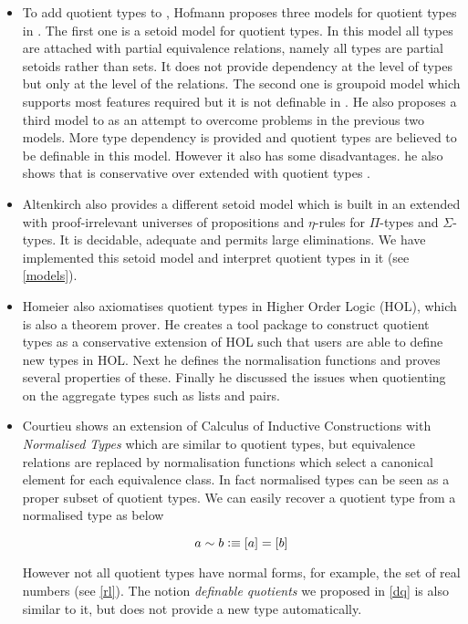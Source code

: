\begin{itemize}
\item To add quotient types to \mltt, Hofmann proposes three models for
quotient types in \cite{hof:phd}. The first one is a setoid model for
quotient types. In this model all types are attached with partial
equivalence relations, namely all types are partial setoids rather than
sets. It does not provide dependency at the level of types but only at the level of the relations. 
The second one is groupoid model which supports most features required 
but it is not definable in \itt. 
He also proposes a third model to as an attempt to overcome problems in the previous two models. More type dependency is provided and quotient types are believed to be definable in this model.
However it also has some disadvantages. 
he also shows that \ett is conservative over \itt extended with quotient types \cite{hof:95:con}.


\item Altenkirch \cite{alti:lics99} also provides a different setoid model which is built in an \itt
extended with proof-irrelevant universes of propositions and $\eta$-rules for $\Pi$-types and $\Sigma$-types. It is decidable, adequate and permits large eliminations. We have implemented this setoid model and interpret quotient types in it (see \autoref{models}).

\item Homeier \cite{hom} also axiomatises quotient types in Higher Order Logic
(HOL), which is also a theorem prover. He creates a tool package to
construct quotient types as a conservative extension of HOL such that
users are able to define new types in HOL. Next he defines the
normalisation functions and proves several properties of
these. Finally he discussed the issues when quotienting on the
aggregate types such as lists and pairs.


\item Courtieu \cite{cou:01} shows an extension of Calculus of Inductive Constructions
with \emph{Normalised Types} which are similar to quotient types, but equivalence relations are replaced by normalisation functions which select a canonical element for each equivalence class. 
In fact normalised types can be seen as a proper subset of quotient types. We can easily recover a quotient type from a normalised type as below

$$a \sim b \vcentcolon\equiv [ a ] = [ b ]$$

However not all quotient types have normal forms, for example, the set of real numbers (see \autoref{rl}).
The notion \emph{definable quotients} we proposed in \autoref{dq} is also similar to it, but does not provide a new type automatically.


\end{itemize}
